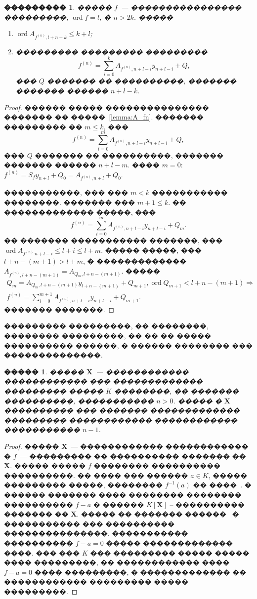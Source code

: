 \documentclass[16pt]{article}
\DeclareMathOperator{\ord}{ord}
\renewcommand{\le}{\leqslant} %
\theoremstyle{plain}
\newtheorem{lemma}[theorem]{�����}
\newtheorem{corollary}[theorem]{���������}
\theoremstyle{definition}
\theoremstyle{remark}
\begin{document}
\begin{corollary}\label{corollary:deriv_equal}
����� $f$~--- ���������������� ���������, $\ord f =l$, � $n>2k$.
�����
\begin{enumerate}
\item $\ord A_{f^{(n)},l+n-k}\leqslant k+l$;

\item ��������� ��������� ���������
$$
f^{(n)}=\sum\limits_{i=0}^{k} A_{f^{(n)},n+l -i}y_{n+l -i} + Q,
$$
��� $Q$  ������� �� ����������, ������� ������� ������ $n+l-k$.
\end{enumerate}
\end{corollary}
\begin{proof} ������ ����� ��������������� ������� �� �����~\ref{lemma:A_fn}. ������� ��������� �� $m\le k$, ���
$$
f^{(n)}=\sum\limits_{i=0}^{m} A_{f^{(n)},n+l -i}y_{n+l -i} + Q,
$$
��� $Q$  ������� �� ����������, ������� ������� ������ $n+l-m$. ���� $m = 0$: $f^{(n)}=S_fy_{n+l}+Q_0=A_{f^{(n)}, n + l}+Q_0$.

�����������, ��� ��� $m<k$ ����������� ��������. ������� ��� $m+1\le k$. �� ������������� �����, ���
$$
f^{(n)}=\sum\limits_{i=0}^{m} A_{f^{(n)},n+l -i}y_{n+l -i} + Q_m.
$$
�� ������� ����������� �������, ��� $\ord A_{f^{(n)}\,n+l -i}\le l+i\le l+m$. ����� �����, ��� $l+n-(m+1)>l+m$, � ������������� $A_{f^{(n)}, l+n-(m+1)} = A_{Q_{m}, l+n-(m+1)}$.
�����
\begin{gather*}Q_{m}=A_{Q_{m}, l+n-(m+1)}y_{l+n-(m+1)}+Q_{m+1},\ord Q_{m+1}<l+n-(m+1)\Rightarrow \\ f^{(n)}=\sum\limits_{i=0}^{m+1} A_{f^{(n)},n+l -i}y_{n+l -i} + Q_{m+1}.
\end{gather*}
������� �������.

\end{proof}
��������� ���������, �� ��������, �������� ���������, �� �� �� �����
���������� ������, � ������ �������� ��� ��������������.

\begin{lemma} \label{lemma:sb_vr_cntm}
����� $\mathbf{X}$~--- ������������ ������������ ��� ������������� ��������� ����� $K$
��������, �� ������� ����������, ����������� $n>0$. ����� �
$\mathbf{X}$ ���������� ��� ������� ������������� ���������
������������ ������������ ����������� $n-1$.
\end{lemma}

\begin{proof}
����� $\mathbf{X}$~--- ������������ ������������ � $f$~--- ���������
�� ���������� ������� �� $\mathbf{X}$. ����� ����� $f$ ��������
���������� ����������. �� ���� ��� ������ $a\in K$, ����� ���������
�����, �������� $f^{-1}(a)$ �� ����~\cite[����� 2, �������� 3, ��� 3.19]{Hartshorn}. � ������ �������
���� �������� �������� ���������� $f-a$ � ������ $K[\mathbf{X}]$ --
���������� ������� �� $\mathbf{X}$. ����� �� ������� ������~\cite[Chapter~5,
Section~12, Theorem~18]{Matsumura} � ����������� ���
���������� ���������������, ����������� ���������� $f-a=0$ �����
������������� ����. ��� ��� $K$ ��� ��������� ����� ����� ����
���������, �� ������������ ���� $f-a=0$ ���� ���������, � ������������� ��
������������ ��������� ����� ���������.
\end{proof}
\end{document}
